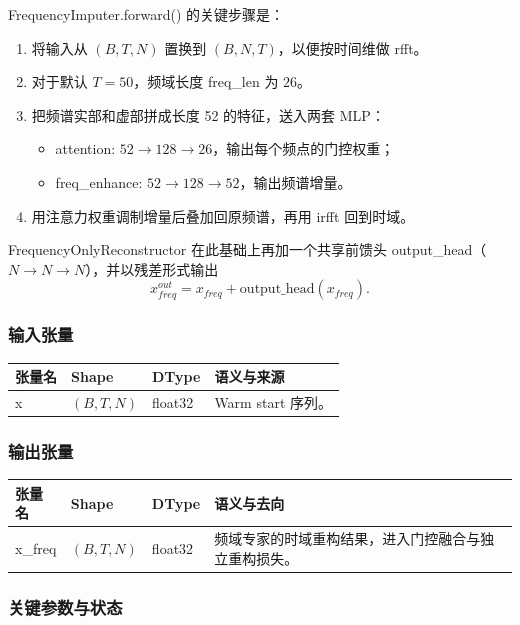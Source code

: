 \documentclass[11pt,a4paper]{ctexart}
\newcommand{\code}[1]{{\ttfamily\small #1}}
\begin{document}
\code{FrequencyImputer.forward()} 的关键步骤是：
\begin{enumerate}
  \item 将输入从 $(B,T,N)$ 置换到 $(B,N,T)$，以便按时间维做 \code{rfft}。
  \item 对于默认 $T=50$，频域长度 \code{freq\_len} 为 $26$。
  \item 把频谱实部和虚部拼成长度 52 的特征，送入两套 MLP：
  \begin{itemize}
    \item \code{attention}: $52 \rightarrow 128 \rightarrow 26$，输出每个频点的门控权重；
    \item \code{freq\_enhance}: $52 \rightarrow 128 \rightarrow 52$，输出频谱增量。
  \end{itemize}
  \item 用注意力权重调制增量后叠加回原频谱，再用 \code{irfft} 回到时域。
\end{enumerate}

\code{FrequencyOnlyReconstructor} 在此基础上再加一个共享前馈头 \code{output\_head}（$N \rightarrow N \rightarrow N$），并以残差形式输出
\[
x_{freq}^{out} = x_{freq} + \text{output\_head}(x_{freq}).
\]

\subsubsection{输入张量}

\begin{tabularx}{\textwidth}{@{}L{3.6cm}L{2.3cm}L{1.5cm}Y@{}}
\toprule
张量名 & Shape & DType & 语义与来源 \\
\midrule
\code{x} & $(B,T,N)$ & \code{float32} & Warm start 序列。 \\
\bottomrule
\end{tabularx}

\subsubsection{输出张量}

\begin{tabularx}{\textwidth}{@{}L{3.6cm}L{2.3cm}L{1.5cm}Y@{}}
\toprule
张量名 & Shape & DType & 语义与去向 \\
\midrule
\code{x\_freq} & $(B,T,N)$ & \code{float32} & 频域专家的时域重构结果，进入门控融合与独立重构损失。 \\
\bottomrule
\end{tabularx}

\subsubsection{关键参数与状态}
\end{document}
